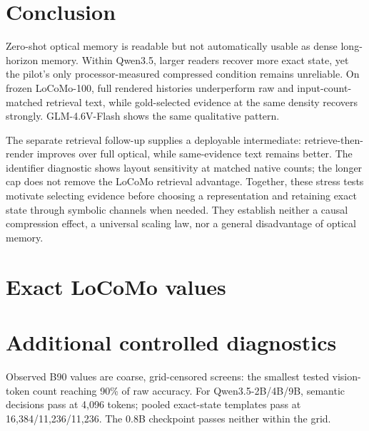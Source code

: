 \documentclass{article}
\begin{document}
\section{Conclusion}

Zero-shot optical memory is readable but not automatically usable as dense long-horizon memory. Within Qwen3.5, larger readers recover more exact state, yet the pilot's only processor-measured compressed condition remains unreliable. On frozen LoCoMo-100, full rendered histories underperform raw and input-count-matched retrieval text, while gold-selected evidence at the same density recovers strongly. GLM-4.6V-Flash shows the same qualitative pattern.

The separate retrieval follow-up supplies a deployable intermediate: retrieve-then-render improves over full optical, while same-evidence text remains better. The identifier diagnostic shows layout sensitivity at matched native counts; the longer cap does not remove the LoCoMo retrieval advantage. Together, these stress tests motivate selecting evidence before choosing a representation and retaining exact state through symbolic channels when needed. They establish neither a causal compression effect, a universal scaling law, nor a general disadvantage of optical memory.

\clearpage

{\small}

\appendix

\section{Exact LoCoMo values}

\begin{table}[H]
  \caption{Exact values underlying Figure~\ref{fig:locomo}. Official LoCoMo token-F1 on the frozen LoCoMo-100 subset; the BM25 input count is matched to full optical within each processor.}
  \label{tab:locomo}
  \centering
  \small
  
\end{table}

\section{Additional controlled diagnostics}
\label{app:controlled}

Observed B90 values are coarse, grid-censored screens: the smallest tested vision-token count reaching 90\% of raw accuracy. For Qwen3.5-2B/4B/9B, semantic decisions pass at 4,096 tokens; pooled exact-state templates pass at 16,384/11,236/11,236. The 0.8B checkpoint passes neither within the grid.
\end{document}
